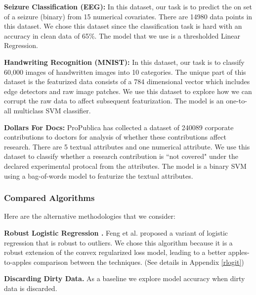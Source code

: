 \noindent\textbf{Seizure Classification (EEG): } In this dataset, our task is to predict the on set of a seizure (binary) from 15 numerical covariates. There are 14980 data points in this dataset. We chose this dataset since the classification task is hard with an accuracy in clean data of 65\%. The model that we use is a thresholded Linear Regression.

\vspace{0.25em}

\noindent\textbf{Handwriting Recognition (MNIST): } In this dataset, our task is to classify 60,000 images of handwritten images into 10 categories. The unique part of this dataset is the featurized data consists of a 784 dimensional vector which includes edge detectors and raw image patches. We use this dataset to explore how we can corrupt the raw data to affect subsequent featurization. The model is an one-to-all multiclass SVM classifier. 

\vspace{0.25em}

\noindent\textbf{Dollars For Docs: } ProPublica has collected a dataset of 240089 corporate contributions to doctors for analysis of whether these contributions affect research. 
There are 5 textual attributes and one numerical attribute.
We use this dataset to classify whether a research contribution is ``not covered" under the declared experimental protocal from the attributes.
The model is a binary SVM using a bag-of-words model to featurize the textual attributes.

\subsubsection{Compared Algorithms}
\noindent Here are the alternative methodologies that we consider:

\vspace{0.25em}

\noindent\textbf{Robust Logistic Regression \cite{feng2014robust}. } Feng et al. proposed a variant of logistic regression that is robust to outliers. We chose this algorithm because it is a robust extension of the convex regularized loss model, leading to a better apples-to-apples comparison between the techniques. (See details in Appendix \ref{rlogit})  

\vspace{0.25em}

\noindent\textbf{Discarding Dirty Data. } As a baseline we explore model accuracy when dirty data is discarded.

